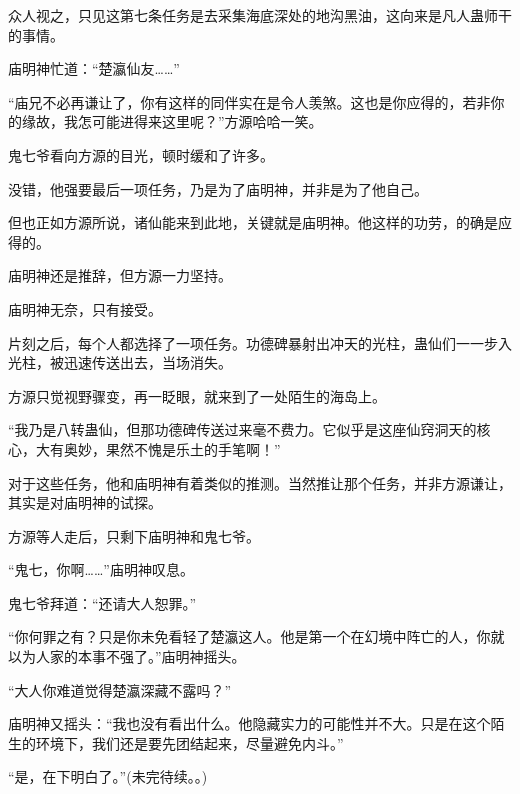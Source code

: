 \begin{this_body}
众人视之，只见这第七条任务是去采集海底深处的地沟黑油，这向来是凡人蛊师干的事情。

庙明神忙道：“楚瀛仙友……”

“庙兄不必再谦让了，你有这样的同伴实在是令人羡煞。这也是你应得的，若非你的缘故，我怎可能进得来这里呢？”方源哈哈一笑。

鬼七爷看向方源的目光，顿时缓和了许多。

没错，他强要最后一项任务，乃是为了庙明神，并非是为了他自己。

但也正如方源所说，诸仙能来到此地，关键就是庙明神。他这样的功劳，的确是应得的。

庙明神还是推辞，但方源一力坚持。

庙明神无奈，只有接受。

片刻之后，每个人都选择了一项任务。功德碑暴射出冲天的光柱，蛊仙们一一步入光柱，被迅速传送出去，当场消失。

方源只觉视野骤变，再一眨眼，就来到了一处陌生的海岛上。

“我乃是八转蛊仙，但那功德碑传送过来毫不费力。它似乎是这座仙窍洞天的核心，大有奥妙，果然不愧是乐土的手笔啊！”

对于这些任务，他和庙明神有着类似的推测。当然推让那个任务，并非方源谦让，其实是对庙明神的试探。

方源等人走后，只剩下庙明神和鬼七爷。

“鬼七，你啊……”庙明神叹息。

鬼七爷拜道：“还请大人恕罪。”

“你何罪之有？只是你未免看轻了楚瀛这人。他是第一个在幻境中阵亡的人，你就以为人家的本事不强了。”庙明神摇头。

“大人你难道觉得楚瀛深藏不露吗？”

庙明神又摇头：“我也没有看出什么。他隐藏实力的可能性并不大。只是在这个陌生的环境下，我们还是要先团结起来，尽量避免内斗。”

“是，在下明白了。”(未完待续。。)

\end{this_body}


